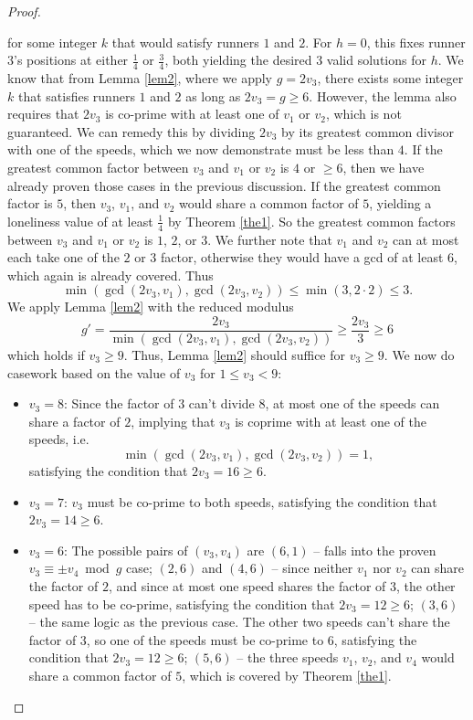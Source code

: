 \documentclass[11pt]{amsart}
\begin{document}
\begin{proof}
\begin{itemize}
        for some integer $k$ that would satisfy runners $1$ and $2$. For $h = 0$, this fixes runner $3$'s positions at either $\frac{1}{4}$ or $\frac{3}{4}$, both yielding the desired $3$ valid solutions for $h$. We know that from Lemma \ref{lem2}, where we apply $g = 2v_3$, there exists some integer $k$ that satisfies runners $1$ and $2$ as long as $2v_3 = g \geq 6$. However, the lemma also requires that $2v_3$ is co-prime with at least one of $v_1$ or $v_2$, which is not guaranteed. We can remedy this by dividing $2v_3$ by its greatest common divisor with one of the speeds, which we now demonstrate must be less than $4$. If the greatest common factor between $v_3$ and $v_1$ or $v_2$ is $4$ or $\geq 6$, then we have already proven those cases in the previous discussion. If the greatest common factor is $5$, then $v_3$, $v_1$, and $v_2$ would share a common factor of $5$, yielding a loneliness value of at least $\frac{1}{4}$ by Theorem \ref{the1}. So the greatest common factors between $v_3$ and $v_1$ or $v_2$ is $1$, $2$, or $3$. We further note that $v_1$ and $v_2$ can at most each take one of the $2$ or $3$ factor, otherwise they would have a gcd of at least $6$, which again is already covered. Thus $$\min(\gcd(2v_3,v_1),\gcd(2v_3,v_2)) \leq \min(3,2 \cdot 2) \leq 3.$$
        We apply Lemma \ref{lem2} with the reduced modulus 
        $$g' = \frac{2v_3}{\min(\gcd(2v_3,v_1),\gcd(2v_3,v_2))} \geq \frac{2v_3}{3} \geq 6$$
        which holds if $v_3 \geq 9$. Thus, Lemma \ref{lem2} should suffice for $v_3 \geq 9$. We now do casework based on the value of $v_3$ for $1 \leq v_3 < 9$:
        \begin{itemize}
            \item[--] $v_3 = 8$: Since the factor of $3$ can't divide $8$, at most one of the speeds can share a factor of $2$, implying that $v_3$ is coprime with at least one of the speeds, i.e. 
            $$\min(\gcd(2v_3, v_1), \gcd(2v_3, v_2)) = 1,$$ satisfying the condition that $2v_3 = 16 \geq 6$.
            \item[--] $v_3 = 7$: $v_3$ must be co-prime to both speeds, satisfying the condition that $2v_3 = 14 \geq 6$.
            \item[--] $v_3 = 6$: The possible pairs of $(v_3,v_4)$ are $(6,1)$ -- falls into the proven $v_3 \equiv \pm v_4 \bmod g$ case; $(2,6)$ and $(4,6)$ -- since neither $v_1$ nor $v_2$ can share the factor of $2$, and since at most one speed shares the factor of $3$, the other speed has to be co-prime, satisfying the condition that $2v_3 = 12 \geq 6$; $(3,6)$ -- the same logic as the previous case. The other two speeds can't share the factor of $3$, so one of the speeds must be co-prime to $6$, satisfying the condition that $2v_3 = 12 \geq 6$; $(5,6)$ -- the three speeds $v_1$, $v_2$, and $v_4$ would share a common factor of $5$, which is covered by Theorem \ref{the1}.

\end{itemize}
\end{itemize}
\end{proof}
\end{document}
